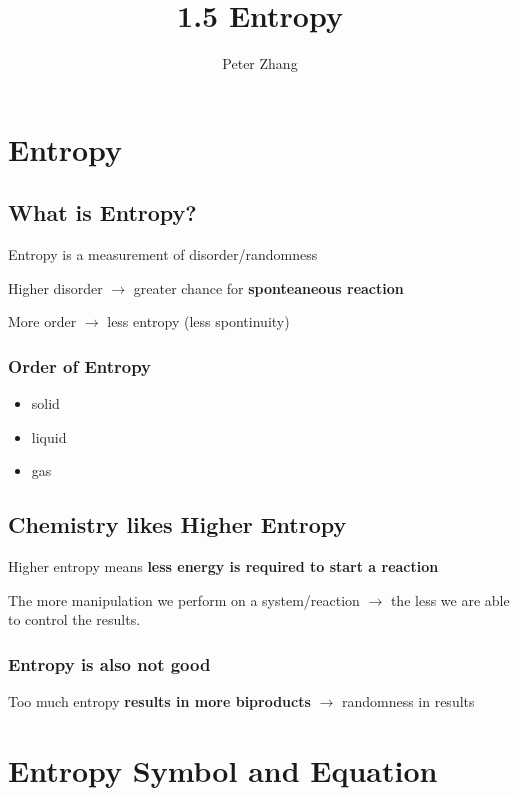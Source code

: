 \documentclass[12pt]{article} %
\title{1.5 Entropy}
\author{Peter Zhang}
\begin{document}
\maketitle

\pagebreak

\tableofcontents

\pagebreak

\section {Entropy}

\subsection{What is Entropy?}

Entropy is a measurement of disorder/randomness

Higher disorder $\rightarrow$ greater chance for \textbf{sponteaneous reaction}

More order $\rightarrow$ less entropy (less spontinuity)

\subsubsection{Order of Entropy}
\begin{itemize}
\item solid
\item liquid
\item gas
\end{itemize}


\subsection{Chemistry likes Higher Entropy}

Higher entropy means \textbf{less energy is required to start a reaction}

The more manipulation we perform on a system/reaction $\rightarrow$ the less we are able to control the results.

\subsubsection{Entropy is also not good}

Too much entropy \textbf{results in more biproducts} $\rightarrow$ randomness in results

\pagebreak

\section{Entropy Symbol and Equation}
\end{document}

